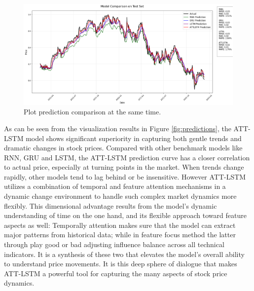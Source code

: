 \documentclass[10pt,twocolumn,letterpaper]{article}
\begin{document}
\begin{figure}[H]
	\centering
	\includegraphics[width=\linewidth]{2.png}
	\caption{Plot prediction comparison at the same time.}
	\label{fig:2}
\end{figure}
As can be seen from the visualization results in Figure \ref{fig:predictions}, the ATT-LSTM model shows significant superiority in capturing both gentle trends and dramatic changes in stock prices. Compared with other benchmark models like RNN, GRU and LSTM, the ATT-LSTM prediction curve has a closer correlation to actual price, especially at turning points in the market. When trends change rapidly, other models tend to lag behind or be insensitive. However ATT-LSTM utilizes a combination of temporal and feature attention mechanisms in a dynamic change environment to handle such complex market dynamics more flexibly. This dimensional advantage results from the model's dynamic understanding of time on the one hand, and its flexible approach toward feature aspects as well: Temporally attention makes sure that the model can extract major patterns from historical data; while in feature focus method the latter through play good or bad adjusting influence balance across all technical indicators. It is a synthesis of these two that elevates the model's overall ability to understand price movements. It is this deep sphere of dialogue that makes ATT-LSTM a powerful tool for capturing the many aspects of stock price dynamics.

\end{document}
